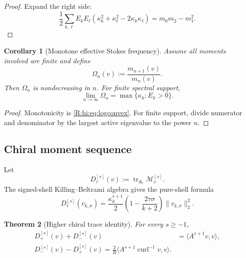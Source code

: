 \documentclass[
 aps,
 prd,
 reprint,
 amsmath,
 amssymb,
 nofootinbib,
 superscriptaddress
]{revtex4-2}
\newtheorem{theorem}{Theorem}[section]
\newtheorem{corollary}[theorem]{Corollary}
\theoremstyle{definition}
\theoremstyle{remark}
\newcommand{\cM}{\mathscr M}
\newcommand{\cK}{\mathfrak K}
\newcommand{\curl}{\operatorname{curl}}
\newcommand{\tr}{\operatorname{tr}}
\begin{document}
\begin{proof}
Expand the right side:
\[
 \frac12\sum_{k,\ell}E_kE_\ell
 (\kappa_k^2+\kappa_\ell^2-2\kappa_k\kappa_\ell)
 =
 m_0m_2-m_1^2.
\]
\end{proof}

\begin{corollary}[Monotone effective Stokes frequency]
\label{R:hi:cor:effectivefrequency}
Assume all moments involved are finite and define
\begin{equation}
 \Omega_n(v)
 :=
 \frac{m_{n+1}(v)}{m_n(v)}.
 \label{R:hi:eq:Omega}
\end{equation}
Then $\Omega_n$ is nondecreasing in $n$.  For finite spectral support,
\begin{equation}
 \lim_{n\to\infty}\Omega_n
 =
 \max\{\kappa_k:E_k>0\}.
 \label{R:hi:eq:Omegalimit}
\end{equation}
\end{corollary}

\begin{proof}
Monotonicity is \eqref{R:hi:eq:logconvex}.  For finite support, divide numerator
and denominator by the largest active eigenvalue to the power $n$.
\end{proof}

\subsection{Chiral moment sequence}

Let
\begin{equation}
 D_\tau^{[s]}(v)
 :=
 \tr_{\cK_\tau}\cM_v^{[s]}.
 \label{R:hi:eq:Dtaus}
\end{equation}
The signed-shell Killing--Beltrami algebra gives the pure-shell formula
\begin{equation}
 D_\tau^{[s]}(v_{k,\sigma})
 =
 \frac{\kappa_k^{s+1}}{2}
 \left(
 1-\frac{2\tau\sigma}{k+2}
 \right)
 \|v_{k,\sigma}\|_2^2.
 \label{R:hi:eq:pureshellD}
\end{equation}

\begin{theorem}[Higher chiral trace identity]
\label{R:hi:thm:chiralhierarchy}
For every $s\ge-1$,
\begin{align}
 D_+^{[s]}(v)+D_-^{[s]}(v)
 &=
 \langle A^{s+1}v,v\rangle,
 \label{R:hi:eq:chiralsum}\\
 \boxed{
 D_-^{[s]}(v)-D_+^{[s]}(v)
 =
 \frac{2}{R}
 \langle A^{s+1}\curl^{-1}v,v\rangle.
 }
 \label{R:hi:eq:chiraldiff}
\end{align}
\end{theorem}
\end{document}
